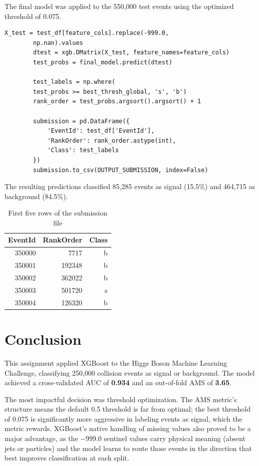 \documentclass[12pt]{article}
\begin{document}
	The final model was applied to the 550,000 test events using the optimized threshold of 0.075.
	
	\begin{lstlisting}[caption={Generating test predictions and submission file}]
		X_test = test_df[feature_cols].replace(-999.0, 
		np.nan).values
		dtest = xgb.DMatrix(X_test, feature_names=feature_cols)
		test_probs = final_model.predict(dtest)
		
		test_labels = np.where(
		test_probs >= best_thresh_global, 's', 'b')
		rank_order = test_probs.argsort().argsort() + 1
		
		submission = pd.DataFrame({
			'EventId': test_df['EventId'],
			'RankOrder': rank_order.astype(int),
			'Class': test_labels
		})
		submission.to_csv(OUTPUT_SUBMISSION, index=False)
	\end{lstlisting}
	
	The resulting predictions classified 85,285 events as signal (15.5\%) and 464,715 as background (84.5\%).
	
	\begin{table}[H]
		\centering
		\begin{tabular}{rrr}
			\toprule
			\textbf{EventId} & \textbf{RankOrder} & \textbf{Class} \\
			\midrule
			350000 & 7717 & b \\
			350001 & 192348 & b \\
			350002 & 362022 & b \\
			350003 & 501720 & s \\
			350004 & 126320 & b \\
			\bottomrule
		\end{tabular}
		\caption{First five rows of the submission file}
	\end{table}
	
	\newpage
	\section*{Conclusion}
	
	This assignment applied XGBoost to the Higgs Boson Machine Learning Challenge, classifying 250,000 collision events as signal or background. The model achieved a cross-validated AUC of \textbf{0.934} and an out-of-fold AMS of \textbf{3.65}.
	
	The most impactful decision was threshold optimization. The AMS metric's structure means the default 0.5 threshold is far from optimal; the best threshold of 0.075 is significantly more aggressive in labeling events as signal, which the metric rewards. XGBoost's native handling of missing values also proved to be a major advantage, as the $-999.0$ sentinel values carry physical meaning (absent jets or particles) and the model learns to route those events in the direction that best improves classification at each split.
	
\end{document}
